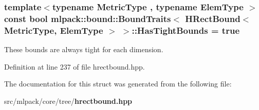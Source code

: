 \subsubsection[{Has\+Tight\+Bounds}]{\setlength{\rightskip}{0pt plus 5cm}template$<$typename Metric\+Type , typename Elem\+Type $>$ const bool {\bf mlpack\+::bound\+::\+Bound\+Traits}$<$ {\bf H\+Rect\+Bound}$<$ Metric\+Type, Elem\+Type $>$ $>$\+::Has\+Tight\+Bounds = true\hspace{0.3cm}{\ttfamily [static]}}\label{structmlpack_1_1bound_1_1BoundTraits_3_01HRectBound_3_01MetricType_00_01ElemType_01_4_01_4_a7023e62f93a8779b011c936795d459e2}


These bounds are always tight for each dimension. 



Definition at line 237 of file hrectbound.\+hpp.



The documentation for this struct was generated from the following file\+:\begin{DoxyCompactItemize}
\item 
src/mlpack/core/tree/{\bf hrectbound.\+hpp}\end{DoxyCompactItemize}
